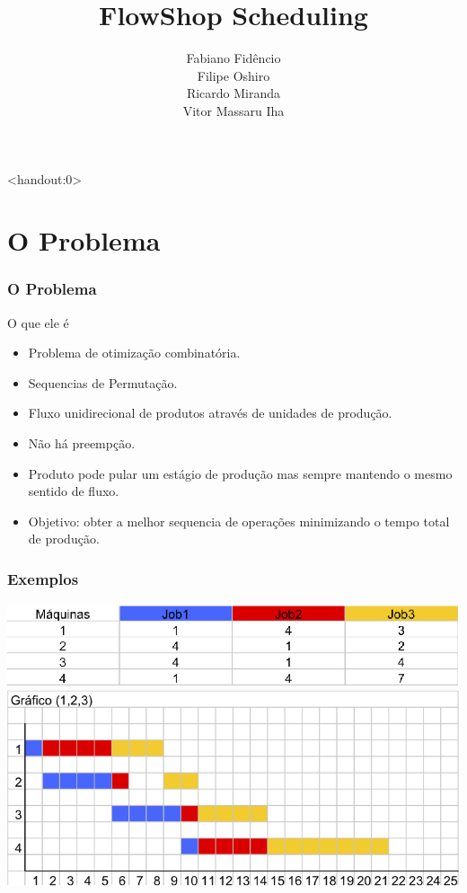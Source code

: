 \documentclass[12pt]{beamer}
\title{FlowShop Scheduling}
\author[Fidêncio,Oshiro,Miranda,Iha]{Fabiano Fidêncio\\ Filipe Oshiro\\ Ricardo Miranda\\ Vitor Massaru Iha}
\institute[IC-UNICAMP]{Instituto de Computação - UNICAMP}
\begin{document}
\begin{frame}<handout:0>
	\titlepage 
\end{frame}


\section{O Problema}
\begin{frame}
	\frametitle{O Problema}
	\begin{block}{O que ele é}
		\begin{itemize}
			\item Problema de otimização combinatória.	\pause
			\item Sequencias de Permutação.	\pause
			\item Fluxo unidirecional de produtos através de unidades de produção. 	\pause
			\item Não há preempção.	\pause
			\item Produto pode pular um estágio de produção mas sempre mantendo o mesmo sentido de fluxo. \pause
			\item Objetivo: obter a melhor sequencia de operações minimizando o tempo total de produção. \pause
		\end{itemize}
	\end{block}
\end{frame}
\begin{frame}
	\frametitle{Exemplos}
	\includegraphics[scale=.6]{tab} \\
	\includegraphics[scale=.6]{graph1} 
\end{frame}
\end{document}
